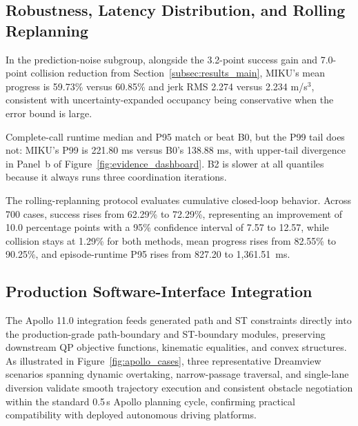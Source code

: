 \subsection{Robustness, Latency Distribution, and Rolling Replanning}
\label{subsec:results_robustness}

In the prediction-noise subgroup, alongside the 3.2-point success gain and 7.0-point collision reduction from Section~\ref{subsec:results_main}, MIKU's mean progress is 59.73\% versus 60.85\% and jerk RMS 2.274 versus 2.234 m/s$^3$, consistent with uncertainty-expanded occupancy being conservative when the error bound is large.

Complete-call runtime median and P95 match or beat B0, but the P99 tail does not: MIKU's P99 is 221.80 ms versus B0's 138.88 ms, with upper-tail divergence in Panel~b of Figure~\ref{fig:evidence_dashboard}. B2 is slower at all quantiles because it always runs three coordination iterations.

The rolling-replanning protocol evaluates cumulative closed-loop behavior. Across 700 cases, success rises from 62.29\% to 72.29\%, representing an improvement of 10.0 percentage points with a 95\% confidence interval of 7.57 to 12.57, while collision stays at 1.29\% for both methods, mean progress rises from 82.55\% to 90.25\%, and episode-runtime P95 rises from 827.20 to 1,361.51~ms.

\subsection{Production Software-Interface Integration}
\label{subsec:results_apollo}

The Apollo 11.0 integration feeds generated path and ST constraints directly into the production-grade path-boundary and ST-boundary modules, preserving downstream QP objective functions, kinematic equalities, and convex structures. As illustrated in Figure~\ref{fig:apollo_cases}, three representative Dreamview scenarios spanning dynamic overtaking, narrow-passage traversal, and single-lane diversion validate smooth trajectory execution and consistent obstacle negotiation within the standard 0.5\,s Apollo planning cycle, confirming practical compatibility with deployed autonomous driving platforms.

